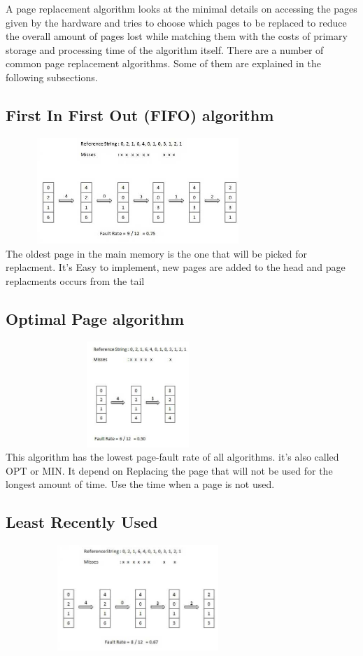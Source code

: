 \documentclass[preprint,12pt]{elsarticle}
\begin{document}
A page replacement algorithm looks at the minimal details on accessing the pages given by the hardware and tries to choose which pages to be replaced to reduce the overall amount of pages lost while matching them with the costs of primary storage and processing time of the algorithm itself. 
There are a number of common page replacement algorithms. Some of them are explained in the following subsections.

\subsection{First In First Out (FIFO) algorithm}

\includegraphics[width=10cm, height=4cm]{fifo.jpg}\\
The oldest page in the main memory is the one that will be picked for replacment. It's Easy to implement, new pages are added to the head and page replacments occurs from the tail

\subsection{Optimal Page algorithm}
\includegraphics[width=10cm, height=4cm]{opr.jpg}\\
This algorithm has the lowest page-fault rate of all algorithms. it's also called OPT or MIN. It depend on Replacing the page that will not be used for the longest amount of time. Use the time when a page is not used.
\subsection{Least Recently Used}
\includegraphics[width=10cm, height=4cm]{lru.jpg}\\
\end{document}
